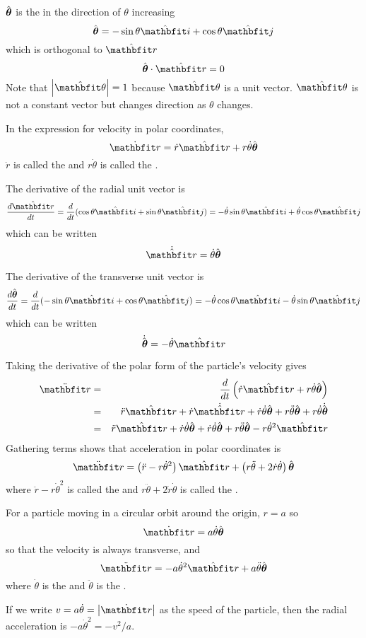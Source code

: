 $\hat{\boldsymbol{\theta}}$ is the  in the direction 
of $\theta$ increasing
$$\tvect=-\sin\theta\ivect+\cos\theta\jvect$$
which is orthogonal to $\rvect$ 
$$\tvect\cdot\rvect=0$$
Note that $\left|\hat{\vect{\theta}}\right|=1$ because $\hat{\vect{\theta}}$ 
is a unit vector.  $\hat{\vect{\theta}}$ is not a constant vector but
changes direction as $\theta$ changes.

In the expression for velocity in polar coordinates,
$$\dot{\vect{r}}=\dot{r}\rvect+r\dot{\theta}\tvect$$
$\dot{r}$ is called the  and $r\dot{\theta}$ is called
the .

The derivative of the radial unit vector is
$$\der{\rvect}{t}=\dbd{t}(\cos\theta\ivect+\sin\theta\jvect)
=-\dot{\theta}\sin\theta\ivect+\dot{\theta}\cos\theta\jvect$$
which can be written
$$\dot{\rvect}=\dot{\theta}\tvect$$

The derivative of the transverse unit vector is
$$\der{\tvect}{t}=\dbd{t}(-\sin\theta\ivect+\cos\theta\jvect)
=-\dot{\theta}\cos\theta\ivect-\dot{\theta}\sin\theta\jvect$$
which can be written
$$\dot{\tvect}=-\dot{\theta}\rvect$$

Taking the derivative of the polar form of the particle's velocity gives
\begin{eqnarray*}
\ddot{\vect{r}}
&=&\dbd{t}\left(\dot{r}\rvect+r\dot{\theta}\tvect\right)\\
&=&\ddot{r}\rvect+\dot{r}\dot{\rvect}+\dot{r}\dot{\theta}\tvect
   +r\ddot{\theta}\tvect+r\dot{\theta}\dot{\tvect} \\
&=&\ddot{r}\rvect+\dot{r}\dot{\theta}\tvect
+\dot{r}\dot{\theta}\tvect+r\ddot{\theta}\tvect-r\dot{\theta}^2\rvect
\end{eqnarray*}
Gathering terms shows that acceleration in polar coordinates is
$$\ddot{\vect{r}}=\left(\ddot{r}-r\dot{\theta}^2\right)\rvect
+\left(r\ddot{\theta}+2\dot{r}\dot{\theta}\right)\tvect$$
where $\ddot{r}-r\dot{\theta}^2$ is called the 
and $r\ddot{\theta}+2\dot{r}\dot{\theta}$ is called the .

\begin{example}
For a particle moving in a circular orbit around the origin, $r=a$ so
$$\dot{\vect{r}}=a\dot{\theta}\tvect$$
so that the velocity is always transverse, and
$$\ddot{\vect{r}}=-a\dot{\theta}^2\rvect+a\ddot{\theta}\tvect$$
where $\dot{\theta}$ is the  and
$\ddot{\theta}$ is the .

If we write $v=a\dot{\theta}=\left|\dot{\vect{r}}\right|$ as the speed of
the particle, then the radial acceleration is $-a\dot{\theta}^2=-v^2/a$.
\end{example}


